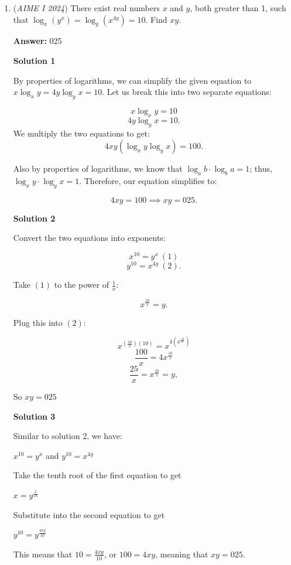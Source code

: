 \begin{enumerate}
 


 


	\item (\textit{AIME I 2024}) There exist real numbers $x$ and $y$, both greater than 1, such that $\log_x(y^x) = \log_y(x^{4y}) = 10.$ Find $xy$.


 
 \textbf{Answer: }025



\textbf{Solution 1}

By properties of logarithms, we can simplify the given equation to $x\log_xy=4y\log_yx=10$. Let us break this into two separate equations: 

 
 \[x\log_xy=10\]
 \[4y\log_yx=10.\]We multiply the two equations to get: 
 \[4xy\left(\log_xy\log_yx\right)=100.\]

 Also by properties of logarithms, we know that $\log_ab\cdot\log_ba=1$; thus, $\log_xy\cdot\log_yx=1$. Therefore, our equation simplifies to: 

 
 \[4xy=100\implies xy=\boxed{025}.\]




\textbf{Solution 2}

Convert the two equations into exponents:

 
 \[x^{10}=y^x~(1)\]
 \[y^{10}=x^{4y}~(2).\]

 Take $(1)$ to the power of $\frac{1}{x}$:

 
 \[x^{\frac{10}{x}}=y.\]

 Plug this into $(2)$:

 
 \[x^{(\frac{10}{x})(10)}=x^{4(x^{\frac{10}{x}})}\]
 \[{\frac{100}{x}}={4x^{\frac{10}{x}}}\]
 \[{\frac{25}{x}}={x^{\frac{10}{x}}}=y,\]

 So $xy=\boxed{025}$




\textbf{Solution 3}

Similar to solution 2, we have:

 $x^{10}=y^x$ and $y^{10}=x^{4y}$

 Take the tenth root of the first equation to get 

 $x=y^{\frac{x}{10}}$ 

 Substitute into the second equation to get 

 $y^{10}=y^{\frac{4xy}{10}}$

 This means that $10=\frac{4xy}{10}$, or $100=4xy$, meaning that $xy=\boxed{025}$.

 




\end{enumerate}
